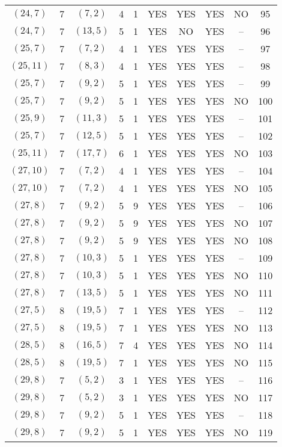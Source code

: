 \begin{longtable}{|c|c|c|c|c|c|c|c|c|c|}
$(24, 7)$ & 7 & $(7, 2)$ & 4 & 1 & YES & YES & YES & NO & 95\\
$(24, 7)$ & 7 & $(13, 5)$ & 5 & 1 & YES & NO & YES & -- & 96\\
$(25, 7)$ & 7 & $(7, 2)$ & 4 & 1 & YES & YES & YES & -- & 97\\
$(25, 11)$ & 7 & $(8, 3)$ & 4 & 1 & YES & YES & YES & -- & 98\\
$(25, 7)$ & 7 & $(9, 2)$ & 5 & 1 & YES & YES & YES & -- & 99\\
$(25, 7)$ & 7 & $(9, 2)$ & 5 & 1 & YES & YES & YES & NO & 100\\
$(25, 9)$ & 7 & $(11, 3)$ & 5 & 1 & YES & YES & YES & -- & 101\\
$(25, 7)$ & 7 & $(12, 5)$ & 5 & 1 & YES & YES & YES & -- & 102\\
$(25, 11)$ & 7 & $(17, 7)$ & 6 & 1 & YES & YES & YES & NO & 103\\
$(27, 10)$ & 7 & $(7, 2)$ & 4 & 1 & YES & YES & YES & -- & 104\\
$(27, 10)$ & 7 & $(7, 2)$ & 4 & 1 & YES & YES & YES & NO & 105\\
$(27, 8)$ & 7 & $(9, 2)$ & 5 & 9 & YES & YES & YES & -- & 106\\
$(27, 8)$ & 7 & $(9, 2)$ & 5 & 9 & YES & YES & YES & NO & 107\\
$(27, 8)$ & 7 & $(9, 2)$ & 5 & 9 & YES & YES & YES & NO & 108\\
$(27, 8)$ & 7 & $(10, 3)$ & 5 & 1 & YES & YES & YES & -- & 109\\
$(27, 8)$ & 7 & $(10, 3)$ & 5 & 1 & YES & YES & YES & NO & 110\\
$(27, 8)$ & 7 & $(13, 5)$ & 5 & 1 & YES & YES & YES & NO & 111\\
$(27, 5)$ & 8 & $(19, 5)$ & 7 & 1 & YES & YES & YES & -- & 112\\
$(27, 5)$ & 8 & $(19, 5)$ & 7 & 1 & YES & YES & YES & NO & 113\\
$(28, 5)$ & 8 & $(16, 5)$ & 7 & 4 & YES & YES & YES & NO & 114\\
$(28, 5)$ & 8 & $(19, 5)$ & 7 & 1 & YES & YES & YES & NO & 115\\
$(29, 8)$ & 7 & $(5, 2)$ & 3 & 1 & YES & YES & YES & -- & 116\\
$(29, 8)$ & 7 & $(5, 2)$ & 3 & 1 & YES & YES & YES & NO & 117\\
$(29, 8)$ & 7 & $(9, 2)$ & 5 & 1 & YES & YES & YES & -- & 118\\
$(29, 8)$ & 7 & $(9, 2)$ & 5 & 1 & YES & YES & YES & NO & 119\\

\end{longtable}
